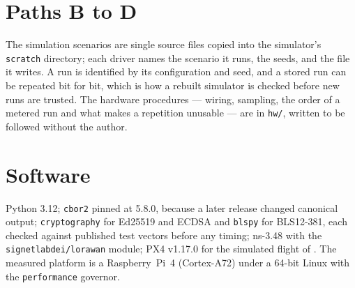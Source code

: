 \section{Paths B to D}

The simulation scenarios are single source files copied into the simulator's \texttt{scratch}
directory; each driver names the scenario it runs, the seeds, and the file it writes. A run is
identified by its configuration and seed, and a stored run can be repeated bit for bit, which
is how a rebuilt simulator is checked before new runs are trusted. The hardware procedures ---
wiring, sampling, the order of a metered run and what makes a repetition unusable --- are in
\texttt{hw/}, written to be followed without the author.

\section{Software}

Python 3.12; \texttt{cbor2} pinned at 5.8.0, because a later release changed canonical output;
\texttt{cryptography} for Ed25519 and ECDSA and \texttt{blspy} for BLS12-381, each checked
against published test vectors before any timing; ns-3.48 with the \texttt{signetlabdei/lorawan}
module; PX4 v1.17.0 for the simulated flight of . The measured platform is a
Raspberry~Pi~4 (Cortex-A72) under a 64-bit Linux with the \texttt{performance} governor.
